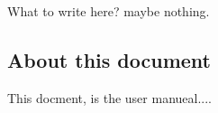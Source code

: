 What to write here? maybe nothing.

\subsection{About this document}
This docment, is the user manueal....
